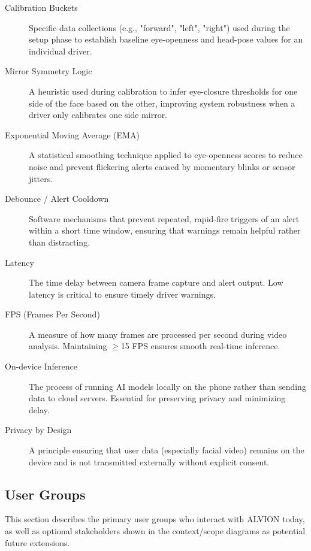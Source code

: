\documentclass[11pt]{report}
\begin{document}
\begin{description}
    \item[Calibration Buckets] Specific data collections (e.g., "forward", "left", "right") used during the setup phase to establish baseline eye-openness and head-pose values for an individual driver.

    \item[Mirror Symmetry Logic] A heuristic used during calibration to infer eye-closure thresholds for one side of the face based on the other, improving system robustness when a driver only calibrates one side mirror.

    \item[Exponential Moving Average (EMA)] A statistical smoothing technique applied to eye-openness scores to reduce noise and prevent flickering alerts caused by momentary blinks or sensor jitters.

    \item[Debounce / Alert Cooldown] Software mechanisms that prevent repeated, rapid-fire triggers of an alert within a short time window, ensuring that warnings remain helpful rather than distracting.

    \item[Latency] The time delay between camera frame capture and alert output. Low latency is critical to ensure timely driver warnings.

    \item[FPS (Frames Per Second)] A measure of how many frames are processed per second during video analysis. Maintaining $\geq$15 FPS ensures smooth real-time inference.

    \item[On-device Inference] The process of running AI models locally on the phone rather than sending data to cloud servers. Essential for preserving privacy and minimizing delay.

    \item[Privacy by Design] A principle ensuring that user data (especially facial video) remains on the device and is not transmitted externally without explicit consent.

\end{description}

\subsection{User Groups}
This section describes the primary user groups who interact with ALVION today, as well as optional stakeholders shown in the context/scope diagrams as potential future extensions.
\end{document}
